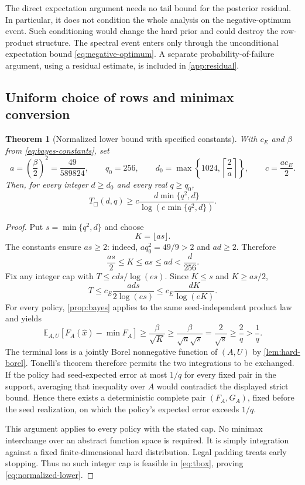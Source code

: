 \documentclass[11pt]{article}
\numberwithin{equation}{section}
\newtheorem{theorem}{Theorem}[section]
\theoremstyle{definition}
\theoremstyle{remark}
\newcommand{\E}{\mathbb E}
\newcommand{\Tbox}{T_{\Box}}
\begin{document}
The direct expectation argument needs no tail bound for the posterior residual. In particular, it does not condition the whole analysis on the negative-optimum event. Such conditioning would change the hard prior and could destroy the row-product structure. The spectral event enters only through the unconditional expectation bound \eqref{eq:negative-optimum}. A separate probability-of-failure argument, using a residual estimate, is included in \cref{app:residual}.

\subsection{Uniform choice of rows and minimax conversion}

\begin{theorem}[Normalized lower bound with specified constants]\label{thm:normalized}
With $c_E$ and $\beta$ from \eqref{eq:bayes-constants}, set
\begin{equation}\label{eq:final-constants}
a=\left(\frac\beta2\right)^2=\frac{49}{589824},\qquad
q_0=256,\qquad
d_0=\max\left\{1024,\left\lceil\frac2a\right\rceil\right\},\qquad
c=\frac{a c_E}{2}.
\end{equation}
Then, for every integer $d\ge d_0$ and every real $q\ge q_0$,
\begin{equation}\label{eq:normalized-lower}
\Tbox(d,q)\ge c\frac{d\min\{q^2,d\}}{\log(e\min\{q^2,d\})}.
\end{equation}
\end{theorem}
\begin{proof}
Put $s=\min\{q^2,d\}$ and choose
\begin{equation}\label{eq:K-choice}
K=\lfloor as\rfloor.
\end{equation}
The constants ensure $as\ge2$: indeed, $aq_0^2=49/9>2$ and $ad\ge2$. Therefore
\begin{equation}\label{eq:K-rounding}
\frac{as}{2}\le K\le as\le ad<\frac d{256}.
\end{equation}
Fix any integer cap with $T\le cds/\log(es)$. Since $K\le s$ and $K\ge as/2$,
\[
T\le c_E\frac{ads}{2\log(es)}
\le c_E\frac{dK}{\log(eK)}.
\]
For every policy, \cref{prop:bayes} applies to the same seed-independent product law and yields
\[
\E_{A,U}[F_A(\widehat x)-\min F_A]
\ge\frac\beta{\sqrt K}
\ge\frac\beta{\sqrt a\sqrt s}
=\frac2{\sqrt s}\ge\frac2q>\frac1q.
\]
The terminal loss is a jointly Borel nonnegative function of $(A,U)$ by \cref{lem:hard-borel}. Tonelli's theorem therefore permits the two integrations to be exchanged. If the policy had seed-expected error at most $1/q$ for every fixed pair in the support, averaging that inequality over $A$ would contradict the displayed strict bound. Hence there exists a deterministic complete pair $(F_A,G_A)$, fixed before the seed realization, on which the policy's expected error exceeds $1/q$.

This argument applies to every policy with the stated cap. No minimax interchange over an abstract function space is required. It is simply integration against a fixed finite-dimensional hard distribution. Legal padding treats early stopping. Thus no such integer cap is feasible in \eqref{eq:tbox}, proving \eqref{eq:normalized-lower}.
\end{proof}
\end{document}
